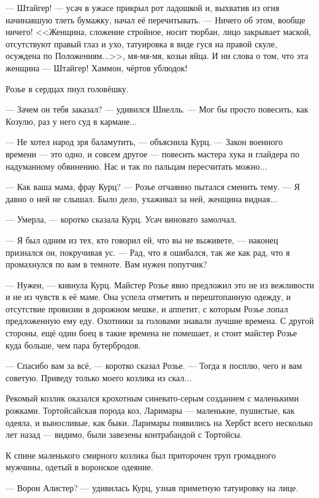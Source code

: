 --- Штайгер! --- усач в ужасе прикрыл рот ладошкой и, выхватив из огня начинавшую тлеть бумажку, начал её перечитывать.
--- Ничего об этом, вообще ничего!
<<Женщина, сложение стройное, носит тюрбан, лицо закрывает маской, отсутствуют правый глаз и ухо, татуировка в виде гуся на правой скуле, осуждена по Положениям...>>, мя-мя-мя, козьи яйца.
И ни слова о том, что эта женщина --- Штайгер!
Хаммон, чёртов ублюдок!

Розье в сердцах пнул головёшку.

--- Зачем он тебя заказал? --- удивился Шнелль.
--- Мог бы просто повесить, как Козулю, раз у него суд в кармане...

--- Не хотел народ зря баламутить, --- объяснила Курц.
--- Закон военного времени --- это одно, и совсем другое --- повесить мастера хука и глайдера по надуманному обвинению.
Нас и так по пальцам пересчитать можно...

--- Как ваша мама, фрау Курц? --- Розье отчаянно пытался сменить тему.
--- Я давно о ней не слышал.
Было дело, ухаживал за ней, женщина видная...

--- Умерла, --- коротко сказала Курц.
Усач виновато замолчал.

--- Я был одним из тех, кто говорил ей, что вы не выживете, --- наконец признался он, покручивая ус.
--- Рад, что я ошибался, так же как рад, что я промахнулся по вам в темноте.
Вам нужен попутчик?

--- Нужен, --- кивнула Курц.
Майстер Розье явно предложил это не из вежливости и не из чувств к её маме.
Она успела отметить и перештопанную одежду, и отсутствие провизии в дорожном мешке, и аппетит, с которым Розье лопал предложенную ему еду.
Охотники за головами знавали лучшие времена.
С другой стороны, ещё один боец в такие времена не помешает, и стоит майстер Розье куда больше, чем пара бутербродов.

--- Спасибо вам за всё, --- коротко сказал Розье.
--- Тогда я посплю, чего и вам советую.
Приведу только моего козлика из скал...

Рекомый козлик оказался крохотным синевато-серым созданием с маленькими рожками.
Тортойсайская порода коз, Ларимары --- маленькие, пушистые, как одеяла, и выносливые, как быки.
Ларимары появились на Хербст всего несколько лет назад --- видимо, были завезены контрабандой с Тортойсы.

К спине маленького смирного козлика был приторочен труп громадного мужчины, одетый в воронское одеяние.

--- Ворон Алистер? --- удивилась Курц, узнав приметную татуировку на лице.

